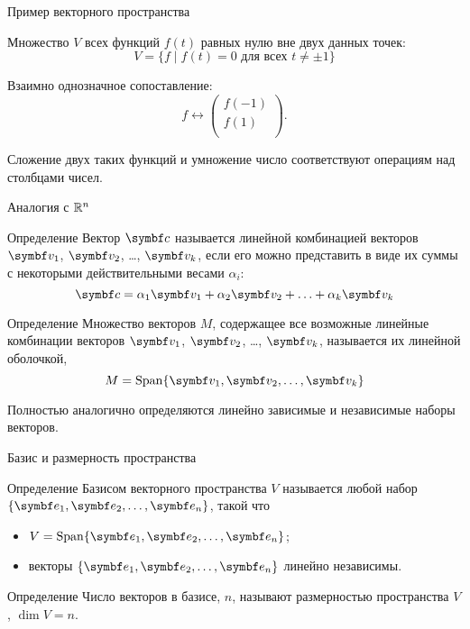 \begin{frame}{Пример векторного пространства}

Множество $V$ всех функций $f(t)$ равных нулю вне двух данных точек:
\[
V  = \{ f \mid f(t)=0 \text{ для всех } t\neq \pm 1 \}
\]

\pause
Взаимно однозначное сопоставление: 
\[f \leftrightarrow \begin{pmatrix}
    f(-1) \\
    f(1) \\
\end{pmatrix}.
\]
\pause


Сложение двух таких функций и умножение  число соответствуют операциям над столбцами чисел.
\end{frame}
    

\begin{frame}{Аналогия с $\mathbb{R}^n$}

\begin{block}{Определение} 
Вектор $\bc$ называется \alert{линейной комбинацией} векторов $\bv_1$, $\bv_2$, \ldots, $\bv_k$, 
если его можно представить в виде их суммы с некоторыми действительными весами $\alpha_i$:
\[
  \bc = \alpha_1 \bv_1 + \alpha_2 \bv_2 + \ldots + \alpha_k \bv_k
\]
\end{block}

\pause
\begin{block}{Определение} 
Множество векторов $M$, содержащее все возможные линейные комбинации векторов $\bv_1$, 
$\bv_2$, \ldots, $\bv_k$, называется их \alert{линейной оболочкой},
\[
  M = \Span\{ \bv_1, \bv_2, \ldots, \bv_k \}
\]
\end{block}
    
\pause 
Полностью аналогично определяются линейно зависимые и независимые наборы векторов. 

\end{frame}


\begin{frame}{Базис и размерность пространства}

\begin{block}{Определение}
\alert{Базисом векторного пространства} $V$ называется любой набор $\{\be_1, \be_2, \ldots, \be_n\}$,
такой что 
\begin{itemize}
    \item $V = \Span \{\be_1, \be_2, \ldots, \be_n\}$;
    \item векторы $\{\be_1, \be_2, \ldots, \be_n\}$ линейно независимы. 
\end{itemize}
\end{block}

\pause
\begin{block}{Определение}
Число  векторов в базисе, $n$, называют \alert{размерностью пространства} $V$, $\dim V = n$.
\end{block}

\end{frame}



